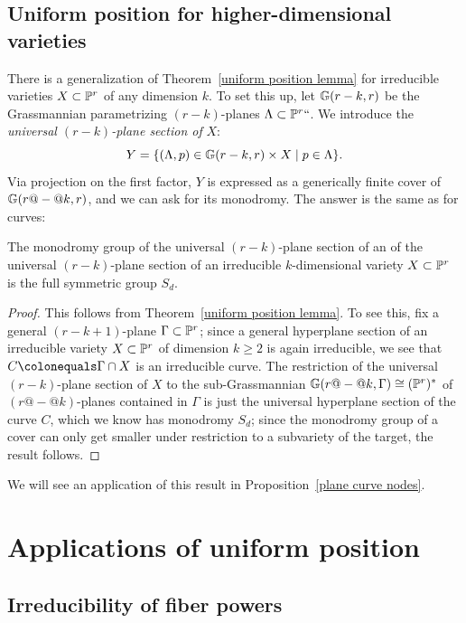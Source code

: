\subsection*{Uniform position for higher-dimensional varieties}

There is
a generalization of Theorem~\ref{uniform position lemma}
for irreducible varieties $X \subset \PP^r$ of any dimension $k$. To set
this up, let $\GG(r-k,r)$ be the
Grassmannian
%
parametrizing $(r-k)$-planes
$\Lambda \subset \PP^r` `$. We introduce the \emph{universal $(r-k)$-plane
section of} $X$:
$$
Y = \{ (\Lambda, p) \in \GG(r-k,r) \times X \mid p \in \Lambda \}.
$$
Via
projection on the first factor, $Y$
is expressed as a generically finite
cover of $\GG(r{@-@}k,r)$, and we can ask for its monodromy. The answer is
the same as for curves:


\begin{theorem}\label{higher dim uniform position lemma}
The monodromy group of the universal $(r-k)$-plane section of an
%
%
of the universal $(r-k)$-plane section of an
irreducible $k$-dimensional variety $X \subset \PP^r$ is the full
%
symmetric group
$S_d$.
\end{theorem}

\begin{proof}
This follows from Theorem~\ref{uniform position lemma}.
To see this,
fix a general $(r-k+1)$-plane $\Gamma \subset \PP^r$; since a
general hyperplane section of an irreducible variety $X \subset \PP^r$
of dimension $k \geq 2$ is again irreducible, we see that $C \colonequals
\Gamma \cap X$ is an irreducible curve. The restriction of the universal
$(r-k)$-plane section of $X$ to the sub-Grassmannian $\GG(r{@-@}k, \Gamma)
\cong (\PP^r)^*$ of $(r{@-@}k)$-planes contained in $\Gamma$ is just the
universal hyperplane section of the curve $C$, which we know has monodromy
$S_d$; since the monodromy group of a cover can only get smaller under
restriction to a subvariety of the target, the result follows.
\end{proof}

We will see an application of this result in
Proposition~\ref{plane curve nodes}.

\section{Applications of uniform position}
\subsection*{Irreducibility of fiber powers}


